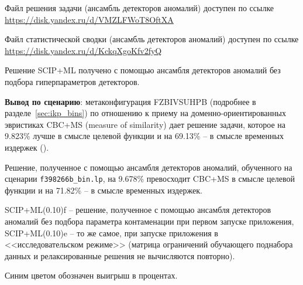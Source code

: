 \documentclass[%
	11pt,
	a4paper,
	utf8,
		]{article}
\begin{document}
Файл решения задачи (ансамбль детекторов аномалий) доступен по ссылке \url{https://disk.yandex.ru/d/VMZLFWoT8OftXA}

Файл статистической сводки (ансамбль детекторов аномалий) доступен по ссылке \url{https://disk.yandex.ru/d/KckqXgoKfv2fyQ}

Решение SCIP+ML получено с помощью ансамбля детекторов аномалий без подбора гиперпараметров детекторов.

\vspace*{3mm}
\textbf{Вывод по сценарию}: метаконфигурация FZBIVSUHPB (подробнее в разделе~\ref{sec:ikp_bins}) по отношению к приему на доменно-ориентированных эвристиках CBC+MS (measure of similarity) дает решение задачи, которое на 9.823\% лучше в смысле целевой функции и на  69.13\% -- в смысле временных издержек ().

Решение, полученное с помощью ансамбля детекторов аномалий, обученного на сценарии \texttt{f398266b\_bin.lp}, на 9.678\% превосходит CBC+MS в смысле целевой функции и на 71.82\% -- в смысле временных издержек.

SCIP+ML(0.10)f -- решение, полученное с помощью ансамбля детекторов аномалий без подбора параметра контаменации при первом запуске приложения, SCIP+ML(0.10)e -- то же самое, при запуске приложения в <<исследовательском режиме>> (матрица ограничений обучающего поднабора данных и релаксированные решения не вычисляются повторно).

Синим цветом обозначен выигрыш в процентах.
\end{document}
